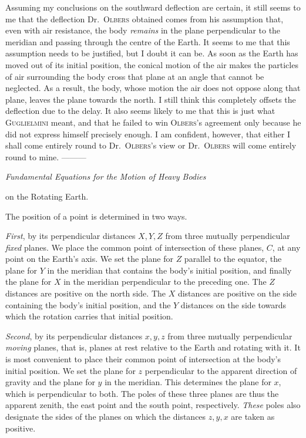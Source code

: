 Assuming my conclusions on the southward deflection are certain, it still seems to me that the deflection Dr.\ \textsc{Olbers} obtained comes from his assumption that, even with air resistance, the body \textit{remains} in the plane perpendicular to the meridian and passing through the centre of the Earth. It seems to me that this assumption needs to be justified, but I doubt it can be. As soon as the Earth has moved out of its initial position, the conical motion of the air makes the particles of air surrounding the body cross that plane at an angle that cannot be neglected. As a result, the body, whose motion the air does not oppose along that plane, leaves the plane towards the north. I still think this completely offsets the deflection due to the delay. It also seems likely to me that this is just what \textsc{Guglielmini} meant, and that he failed to win \textsc{Olbers}'s agreement only because he did not express himself precisely enough. I am confident, however, that either I shall come entirely round to Dr.\ \textsc{Olbers}'s view or Dr.\ \textsc{Olbers} will come entirely round to mine. —\quad—\quad—

\begin{center}{\large\itshape Fundamental Equations for the Motion of Heavy Bodies\par on the Rotating Earth.}\end{center}
The position of a point is determined in two ways.

\textit{First}, by its perpendicular distances $X,Y,Z$ from three mutually perpendicular \textit{fixed} planes. We place the common point of intersection of these planes, $C$, at any point on the Earth's axis. We set the plane for $Z$ parallel to the equator, the plane for $Y$ in the meridian that contains the body's initial position, and finally the plane for $X$ in the meridian perpendicular to the preceding one. The $Z$ distances are positive on the north side. The $X$ distances are positive on the side containing the body's initial position, and the $Y$ distances on the side towards which the rotation carries that initial position.

\textit{Second}, by its perpendicular distances $x,y,z$ from three mutually perpendicular \textit{moving} planes, that is, planes at rest relative to the Earth and rotating with it. It is most convenient to place their common point of intersection at the body's initial position. We set the plane for $z$ perpendicular to the apparent direction of gravity and the plane for $y$ in the meridian. This determines the plane for $x$, which is perpendicular to both. The poles of these three planes are thus the apparent zenith, the east point and the south point, respectively. \textit{These} poles also designate the sides of the planes on which the distances $z,y,x$ are taken as positive.

